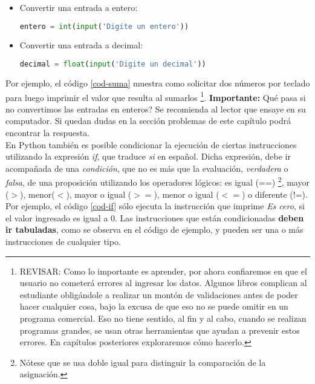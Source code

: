 \begin{itemize}
 \item Convertir una entrada a entero: 
 \begin{lstlisting}[language=Python]
 entero = int(input('Digite un entero')) \end{lstlisting}
 \item Convertir una entrada a decimal:
 \begin{lstlisting}[language=Python]
 decimal = float(input('Digite un decimal')) \end{lstlisting}
\end{itemize}

 Por ejemplo, el código \ref{cod-suma} muestra como solicitar dos números por teclado para luego imprimir el valor que resulta al sumarlos \footnote{REVISAR: Como lo importante es aprender, por ahora confiaremos en que el usuario no cometerá errores al ingresar los datos. Algunos libros complican al estudiante obligándole a realizar un montón de validaciones antes de poder hacer cualquier cosa, bajo la excusa de que eso no se puede omitir en un programa comercial. Eso no tiene sentido, al fin y al cabo, cuando se realizan programas grandes, se usan otras herramientas que ayudan a prevenir estos errores. En capítulos posteriores exploraremos cómo hacerlo.}. \textbf{Importante:} Qué pasa si no convertimos las entradas en enteros? Se recomienda al lector que ensaye en su computador. Si quedan dudas en la sección problemas de este capítulo podrá encontrar la respuesta. \\



En Python también es posible condicionar la ejecución de ciertas instrucciones utilizando la expresión \emph{if}, que traduce \emph{si} en español. Dicha expresión, debe ir acompañada de una \emph{condición}, que no es más que la evaluación, \emph{verdadera} o \emph{falsa}, de una proposición utilizando los operadores lógicos: es igual (==) \footnote{Nótese que se usa doble igual para distinguir la comparación de la asignación.}, mayor ($>$), menor($<$), mayor o igual ($>=$), menor o igual ($<=$) o diferente (!=). Por ejemplo, el código \ref{cod-if} sólo ejecuta la instrucción que imprime \emph{Es cero}, si  el valor ingresado es igual a 0. Las instrucciones que están condicionadas \textbf{deben ir tabuladas}, como se observa en el código de ejemplo, y pueden ser una o más instrucciones de cualquier tipo. \\

